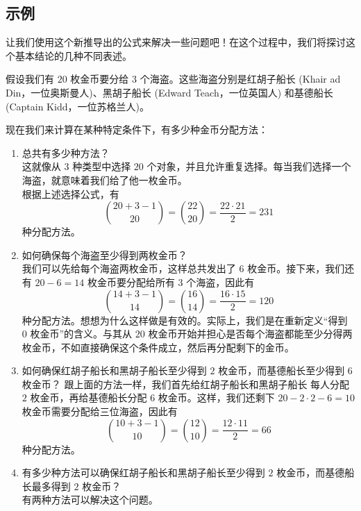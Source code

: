 
\subsection{示例}

让我们使用这个新推导出的公式来解决一些问题吧！在这个过程中，我们将探讨这个基本结论的几种不同表述。\\

\begin{example}
      假设我们有 $20$ 枚金币要分给 $3$ 个海盗。这些海盗分别是红胡子船长 (Khair ad Din，一位奥斯曼人)、黑胡子船长 (Edward Teach，一位英国人) 和基德船长 (Captain Kidd，一位苏格兰人)。

      现在我们来计算在某种特定条件下，有多少种金币分配方法：
      \begin{enumerate}[label=(\arabic*)]
            \item 总共有多少种方法？\\
                  这就像从 $3$ 种类型中选择 $20$ 个对象，并且允许重复选择。每当我们选择一个海盗，就意味着我们给了他一枚金币。\\
                  根据上述选择公式，有
                  \[{20+3-1 \choose 20}={22 \choose 20}=\frac{22 \cdot 21}{2}=231\]
                  种分配方法。
            \item 如何确保每个海盗至少得到两枚金币？\\
                  我们可以先给每个海盗两枚金币，这样总共发出了 $6$ 枚金币。接下来，我们还有 $20 - 6 = 14$ 枚金币要分配给所有 $3$ 个海盗，因此有
                  \[{14+3-1 \choose 14}={16 \choose 14}=\frac{16 \cdot 15}{2}=120\]
                  种分配方法。想想为什么这样做是有效的。实际上，我们是在重新定义``得到 $0$ 枚金币''的含义。与其从 $20$ 枚金币开始并担心是否每个海盗都能至少分得两枚金币，不如直接确保这个条件成立，然后再分配剩下的金币。
            \item 如何确保红胡子船长和黑胡子船长至少得到 $2$ 枚金币，而基德船长至少得到 $6$ 枚金币？
                  跟上面的方法一样，我们首先给红胡子船长和黑胡子船长 每人分配 $2$ 枚金币，再给基德船长分配 $6$ 枚金币。这样，我们还剩下 $20 - 2 \cdot 2 - 6 = 10$ 枚金币需要分配给三位海盗，因此有
                  \[{10+3-1 \choose 10}={12 \choose 10}=\frac{12 \cdot 11}{2}=66\]
                  种分配方法。
            \item 有多少种方法可以确保红胡子船长和黑胡子船长至少得到 $2$ 枚金币，而基德船长最多得到 $2$ 枚金币？\\
                  有两种方法可以解决这个问题。

\end{enumerate}
\end{example}
